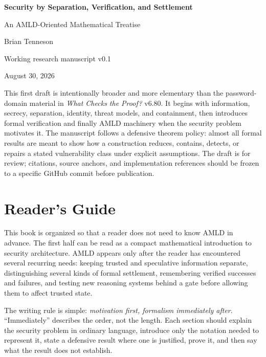 \documentclass[11pt,oneside]{book}
\theoremstyle{definition}
\theoremstyle{remark}
\begin{document}
\frontmatter
\begin{titlepage}
\centering
\vspace*{1.2in}
{\Huge\bfseries Security by Separation, Verification, and Settlement\par}
\vspace{0.3in}
{\Large An AMLD-Oriented Mathematical Treatise\par}
\vspace{0.7in}
{\large Brian Tenneson\par}
\vspace{0.25in}
{\large Working research manuscript v0.1\par}
\vspace{0.1in}
{\large August 30, 2026\par}
\vfill
\begin{minipage}{0.82\textwidth}
\small
This first draft is intentionally broader and more elementary than the password-domain material in \emph{What Checks the Proof?} v6.80. It begins with information, secrecy, separation, identity, threat models, and containment, then introduces formal verification and finally AMLD machinery when the security problem motivates it. The manuscript follows a defensive theorem policy: almost all formal results are meant to show how a construction reduces, contains, detects, or repairs a stated vulnerability class under explicit assumptions. The draft is for review; citations, source anchors, and implementation references should be frozen to a specific GitHub commit before publication.
\end{minipage}
\end{titlepage}

\chapter*{Reader's Guide}
This book is organized so that a reader does not need to know AMLD in advance. The first half can be read as a compact mathematical introduction to security architecture. AMLD appears only after the reader has encountered several recurring needs: keeping trusted and speculative information separate, distinguishing several kinds of formal settlement, remembering verified successes and failures, and testing new reasoning systems behind a gate before allowing them to affect trusted state.

The writing rule is simple: \emph{motivation first, formalism immediately after}. ``Immediately'' describes the order, not the length. Each section should explain the security problem in ordinary language, introduce only the notation needed to represent it, state a defensive result where one is justified, prove it, and then say what the result does not establish.
\end{document}

